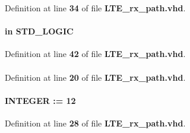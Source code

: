 Definition at line {\bf 34} of file {\bf L\+T\+E\+\_\+rx\+\_\+path.\+vhd}.

\paragraph[{fr\+\_\+start}]{ {\bfseries \textcolor{keywordflow}{in}\textcolor{vhdlchar}{ }} {\bfseries \textcolor{comment}{S\+T\+D\+\_\+\+L\+O\+G\+IC}\textcolor{vhdlchar}{ }} \hspace{0.3cm}{\ttfamily [Port]}}\label{classLTE__rx__path_a0553781421ebc757ddaddbbecc111dd7}


Definition at line {\bf 42} of file {\bf L\+T\+E\+\_\+rx\+\_\+path.\+vhd}.

\paragraph[{ieee}]{\hspace{0.3cm}{\ttfamily [Library]}}\label{classLTE__rx__path_a0a6af6eef40212dbaf130d57ce711256}


Definition at line {\bf 20} of file {\bf L\+T\+E\+\_\+rx\+\_\+path.\+vhd}.

\paragraph[{infifo\+\_\+wrsize}]{ {\bfseries \textcolor{vhdlchar}{ }} {\bfseries \textcolor{comment}{I\+N\+T\+E\+G\+ER}\textcolor{vhdlchar}{ }\textcolor{vhdlchar}{ }\textcolor{vhdlchar}{\+:}\textcolor{vhdlchar}{=}\textcolor{vhdlchar}{ }\textcolor{vhdlchar}{ } \textcolor{vhdldigit}{12} \textcolor{vhdlchar}{ }} \hspace{0.3cm}{\ttfamily [Generic]}}\label{classLTE__rx__path_ad8ed1f20ad8f6ab3fe96d66e2273c58b}


Definition at line {\bf 28} of file {\bf L\+T\+E\+\_\+rx\+\_\+path.\+vhd}.

